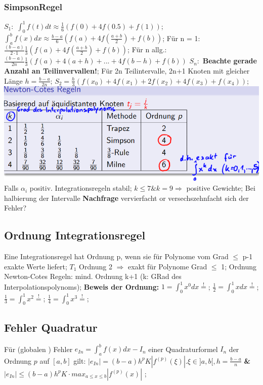 \subsubsection{SimpsonRegel}
$ S_{1}: $ 
$ \int_{0}^{1} f (t) dt \approx \frac{1}{6} ( f(0) + 4f(0.5) + f(1) ) $; 
$\int_{a}^{b} f (x) dx \approx \frac{b-a}{6} ( f(a) + 4f( \frac{a+b}{2}) + f(b) ) $; 
Für n = 1: $\frac{( b-a )}{2\cdot1} \frac{1}{3} ( f(a) + 4f( \frac{a+b}{2}) + f(b) ) $; 
Für n allg.: $ \frac{( b-a) }{2n}\frac{1}{3} ( f(a) + 4(a+h) + ... + 4f(b-h)+ f(b) ) $ 
$ S_{n}:$ 
\textbf{Beachte gerade Anzahl an Teilinvervallen!}; 
Für 2n Teilintervalle, 2n+1 Knoten mit gleicher Länge $ h = \frac{ b-a }{2n} $; 
$ S_{2} = \frac{h}{3} ( f(x_{0}) + 4f(x_{1}) + 2f(x_{2}) + 4f(x_{3}) + f(x_{4}) ) $; 
\includegraphics[scale=0.25]{./pic/NewtonCodesRegeln.png}
Falls $\alpha_{i} $ positiv. Integrationsregeln stabil; 
$ k \le 7 \& k =9 \Rightarrow $ positive Gewichte;
Bei halbierung der Intervalle \textbf{Nachfrage} vervierfacht or versechszehnfacht sich der Fehler?
\subsection{Ordnung Integrationsregel}
Eine Integrationsregel hat Ordnung p, wenn sie für Polynome vom Grad $\le$ p-1 exakte Werte liefert; $ T_{1} $ Ordnung 2 $\Rightarrow$ exakt für Polynome Grad $\le$ 1; 
Ordnung Newton-Cotes Regeln: mind. Ordnung k+1 (k: GRad des Interpolationspolynoms);
\textbf{Beweis der Ordnung:}
$ 1 = \int_{0}^{1} x^{0} dx \overset{!}{=} $; 
$ \frac{1}{2} = \int_{0}^{1} x dx \overset{!}{=} $; 
$ \frac{1}{3} = \int_{0}^{1} x^{2} \overset{!}{=} $; 
$ \frac{1}{4} = \int_{0}^{1} x^{3} \overset{!}{=} $; 
\subsection{Fehler Quadratur}
Für (globalen ) Fehler $ e_{In}  = \int_{a}^{b} f(x) dx -I_{n} $ einer Quadraturformel $I_{n} $ der Ordnung $ p$  auf $ [a,b] $ gilt: 
$ |e_{In} | = (b-a) h^{p}K|f^{ (p) } (\xi)| . \xi \in ]a,b[, h = \frac{ b-a }{ n}  $ \textbf{\&} 
$ |e_{In} | \le (b-a) h^{p} K \cdot max_{a \le x \le b} | f^{ (p) } (x) | $ ; 
